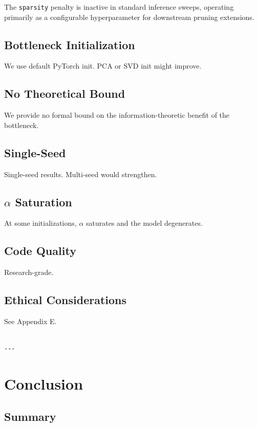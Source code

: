 The \texttt{sparsity} penalty is inactive in standard inference sweeps, operating primarily as a configurable hyperparameter for downstream pruning extensions.

\subsection{Bottleneck Initialization}

We use default PyTorch init. PCA or SVD init might improve.

\subsection{No Theoretical Bound}

We provide no formal bound on the information-theoretic benefit of the 
bottleneck.

\subsection{Single-Seed}

Single-seed results. Multi-seed would strengthen.

\subsection{$\alpha$ Saturation}

At some initializations, $\alpha$ saturates and the model degenerates.

\subsection{Code Quality}

Research-grade.

\subsection{Ethical Considerations}

See Appendix E.
\begin{lstlisting}

---
\end{lstlisting}

\section{Conclusion}

\subsection{Summary}

